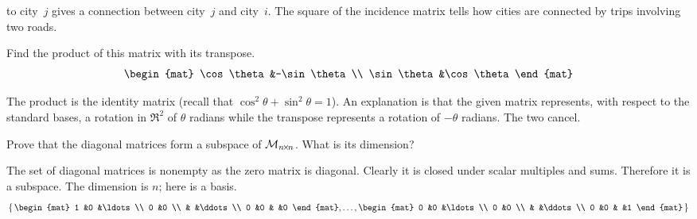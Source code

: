 \begin{exercises}
\begin{answer}
\begin{exparts}
          to city~\( j \) gives a connection between city~\( j \) and 
          city~\( i \).
        \partsitem The square of the incidence matrix tells how cities
          are connected
          by trips involving two roads.
      \end{exparts}  
   \end{answer}
  \item 
    Find the product of this matrix with its transpose.
    \begin{equation*}
      \begin{mat}
        \cos\theta  &-\sin\theta  \\
        \sin\theta  &\cos\theta
      \end{mat}
    \end{equation*}
    \begin{answer}
      The product is the identity matrix (recall that
      $\cos^2\theta+\sin^2\theta =1$).
      An explanation is that the given matrix represents, with respect to
      the standard bases, a rotation in \( \Re^2 \) of \( \theta \)
      radians while the transpose represents a rotation of \( -\theta \)
      radians.
      The two cancel.  
     \end{answer}
  \recommended \item 
    Prove that the diagonal matrices form a subspace of
    \( \mathcal{M}_{n \! \times \! n} \).
    What is its dimension?
    \begin{answer}
      The set of diagonal matrices is nonempty as the zero matrix is
      diagonal.
      Clearly it is closed under scalar multiples and sums.
      Therefore it is a subspace.
      The dimension is \( n \); here is a basis.
      \begin{equation*}
        \set{\begin{mat}
               1  &0  &\ldots    \\
               0  &0             \\
                  &   &\ddots    \\
               0  &0  &      &0
             \end{mat},\ldots,
             \begin{mat}
               0  &0  &\ldots    \\
               0  &0             \\
                  &   &\ddots    \\
               0  &0  &      &1
             \end{mat}  }
      \end{equation*} 

\end{answer}
\end{exercises}
